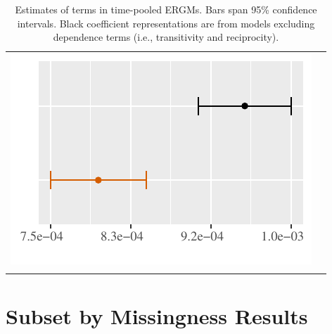 \documentclass[reqno,onecolumn,letterpaper,12pt]{article}
\begin{document}
\begin{longtable}[!h]{c@{\hskip 0cm}c}
\includegraphics[height=.18\textheight, clip=true, trim=0cm 0cm 0cm .2cm]{draft_figures/plots_pooled/Trade_out.pdf}   \\

\caption{\label{fig:effectPlots2} Estimates of terms in time-pooled ERGMs. Bars span 95\% confidence intervals. Black coefficient representations are from models excluding dependence terms (i.e., transitivity and reciprocity).}

\end{longtable}


\section{Subset by Missingness Results}\label{qlevelresults}
\end{document}
